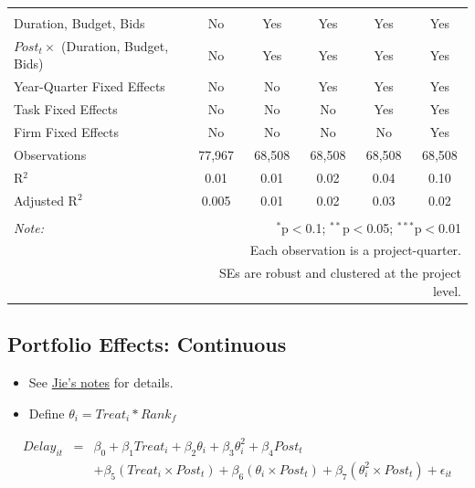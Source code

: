 \documentclass[
]{article}
\providecommand{\tightlist}{%
  \setlength{\itemsep}{0pt}\setlength{\parskip}{0pt}}
\begin{document}
\begin{table}[H]
\begin{tabular}{@{\extracolsep{-2pt}}lccccc}
  & & & & & \\ 
\hline \\[-1.8ex] 
Duration, Budget, Bids & No & Yes & Yes & Yes & Yes \\ 
$Post_t \times$  (Duration, Budget, Bids) & No & Yes & Yes & Yes & Yes \\ 
Year-Quarter Fixed Effects & No & No & Yes & Yes & Yes \\ 
Task Fixed Effects & No & No & No & Yes & Yes \\ 
Firm Fixed Effects & No & No & No & No & Yes \\ 
Observations & 77,967 & 68,508 & 68,508 & 68,508 & 68,508 \\ 
R$^{2}$ & 0.01 & 0.01 & 0.02 & 0.04 & 0.10 \\ 
Adjusted R$^{2}$ & 0.005 & 0.01 & 0.02 & 0.03 & 0.02 \\ 
\hline 
\hline \\[-1.8ex] 
\textit{Note:}  & \multicolumn{5}{r}{$^{*}$p$<$0.1; $^{**}$p$<$0.05; $^{***}$p$<$0.01} \\ 
 & \multicolumn{5}{r}{Each observation is a project-quarter.} \\ 
 & \multicolumn{5}{r}{SEs are robust and clustered at the project level.} \\ 
\end{tabular} 
\end{table}

\hypertarget{portfolio-effects-continuous}{%
\subsection{Portfolio Effects:
Continuous}\label{portfolio-effects-continuous}}

\begin{itemize}
\tightlist
\item
  See
  \href{https://github.com/QuickPay-Operational-Performance/Data-and-code/blob/master/notes/Portfolio\%20model\%2B0308.pdf}{Jie's
  notes} for details.
\item
  Define \(\theta_i = Treat_i*Rank_f\)
\end{itemize}

\[ \begin{aligned} Delay_{it} &=& \beta_0+\beta_1 Treat_i + \beta_2 \theta_i+\beta_3 \theta_i^2+\beta_4 Post_t\\&& + \beta_5 (Treat_i\times Post_t) + \beta_6 (\theta_i\times Post_t) +\beta_7 (\theta_i^2\times Post_t)+\epsilon_{it} \end{aligned} \]
\end{document}
